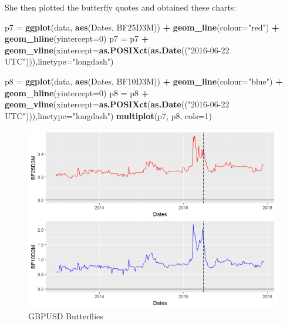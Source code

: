 \documentclass[]{book}
\newenvironment{Shaded}{\begin{snugshade}}{\end{snugshade}}
\newcommand{\KeywordTok}[1]{\textcolor[rgb]{0.13,0.29,0.53}{\textbf{#1}}}
\newcommand{\DataTypeTok}[1]{\textcolor[rgb]{0.13,0.29,0.53}{#1}}
\newcommand{\DecValTok}[1]{\textcolor[rgb]{0.00,0.00,0.81}{#1}}
\newcommand{\StringTok}[1]{\textcolor[rgb]{0.31,0.60,0.02}{#1}}
\newcommand{\OperatorTok}[1]{\textcolor[rgb]{0.81,0.36,0.00}{\textbf{#1}}}
\newcommand{\NormalTok}[1]{#1}
\theoremstyle{definition}
\theoremstyle{definition}
\theoremstyle{definition}
\theoremstyle{remark}
\begin{document}
She then plotted the butterfly quotes and obtained these charts:

\begin{Shaded}
\begin{Highlighting}[]
\NormalTok{p7 =}\StringTok{ }\KeywordTok{ggplot}\NormalTok{(data, }\KeywordTok{aes}\NormalTok{(Dates, BF25D3M)) }\OperatorTok{+}\StringTok{ }\KeywordTok{geom_line}\NormalTok{(}\DataTypeTok{colour=}\StringTok{"red"}\NormalTok{) }\OperatorTok{+}\StringTok{ }\KeywordTok{geom_hline}\NormalTok{(}\DataTypeTok{yintercept=}\DecValTok{0}\NormalTok{)}
\NormalTok{p7 =}\StringTok{ }\NormalTok{p7 }\OperatorTok{+}\StringTok{ }\KeywordTok{geom_vline}\NormalTok{(}\DataTypeTok{xintercept=}\KeywordTok{as.POSIXct}\NormalTok{(}\KeywordTok{as.Date}\NormalTok{((}\StringTok{"2016-06-22 UTC"}\NormalTok{))),}\DataTypeTok{linetype=}\StringTok{"longdash"}\NormalTok{)}

\NormalTok{p8 =}\StringTok{ }\KeywordTok{ggplot}\NormalTok{(data, }\KeywordTok{aes}\NormalTok{(Dates, BF10D3M)) }\OperatorTok{+}\StringTok{ }\KeywordTok{geom_line}\NormalTok{(}\DataTypeTok{colour=}\StringTok{"blue"}\NormalTok{) }\OperatorTok{+}\StringTok{ }\KeywordTok{geom_hline}\NormalTok{(}\DataTypeTok{yintercept=}\DecValTok{0}\NormalTok{)}
\NormalTok{p8 =}\StringTok{ }\NormalTok{p8 }\OperatorTok{+}\StringTok{ }\KeywordTok{geom_vline}\NormalTok{(}\DataTypeTok{xintercept=}\KeywordTok{as.POSIXct}\NormalTok{(}\KeywordTok{as.Date}\NormalTok{((}\StringTok{"2016-06-22 UTC"}\NormalTok{))),}\DataTypeTok{linetype=}\StringTok{"longdash"}\NormalTok{)}
\KeywordTok{multiplot}\NormalTok{(p7, p8, }\DataTypeTok{cols=}\DecValTok{1}\NormalTok{)}
\end{Highlighting}
\end{Shaded}

\begin{figure}
\includegraphics[width=1\linewidth]{images/unnamed-chunk-19-1} \caption{GBPUSD Butterflies}\label{fig:unnamed-chunk-19}
\end{figure}
\end{document}
